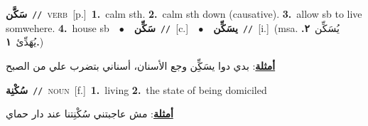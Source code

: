 \documentclass[10pt,a4paper,twoside]{article} %
\begin{document}
\begin{multicols}{2}
{\setlength\topsep{0pt}\textbf{\foreignlanguage{arabic}{سَكَّن}}\ {\color{gray}\texttt{//}\color{black}}\ \textsc{verb}\ [p.]\ \textbf{1.}~calm sth.  \textbf{2.}~calm sth down (causative).  \textbf{3.}~allow sb to live somwehere.  \textbf{4.}~house sb\ \ $\bullet$\ \ \setlength\topsep{0pt}\textbf{\foreignlanguage{arabic}{سَكِّن}}\ {\color{gray}\texttt{//}\color{black}}\ [c.]\ \ $\bullet$\ \ \setlength\topsep{0pt}\textbf{\foreignlanguage{arabic}{يسَكِّن}}\ {\color{gray}\texttt{//}\color{black}}\ [i.]\ \color{gray}(msa. \foreignlanguage{arabic}{يُسَكِّن}~\foreignlanguage{arabic}{\textbf{٢.}}  \foreignlanguage{arabic}{يُهَدِّئ}~\foreignlanguage{arabic}{\textbf{١.}})\color{black}\  \begin{flushright}\color{gray}\foreignlanguage{arabic}{\textbf{\underline{\foreignlanguage{arabic}{أمثلة}}}: بدي دوا يسَكِِّن وجع الأسنان، أسناني بتضرب علي من الصبح}\end{flushright}\color{black}} \vspace{2mm}

{\setlength\topsep{0pt}\textbf{\foreignlanguage{arabic}{سُكْنِة}}\ {\color{gray}\texttt{//}\color{black}}\ \textsc{noun}\ [f.]\ \textbf{1.}~living  \textbf{2.}~the state of being domiciled\  \begin{flushright}\color{gray}\foreignlanguage{arabic}{\textbf{\underline{\foreignlanguage{arabic}{أمثلة}}}: مش عاجبتني سُكْنِتنا عند دار حماي}\end{flushright}\color{black}} \vspace{2mm}


\end{multicols}
\end{document}
